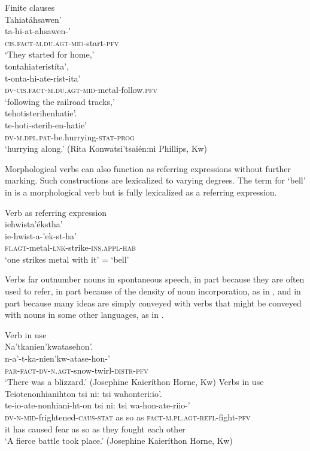 \documentclass[output=paper,colorlinks,citecolor=brown]{langscibook}
\begin{document}
{
\ea\label{ex:moh:5}Finite clauses\\
    \glll Tahiatáhsawen’ \\ 
          ta-hi-at-ahsawen-’ \\ 
          \textsc{cis.fact-m.du.agt-mid}-start-\textsc{pfv} \\
    \glt ‘They started for home,’\\ 
    \medskip
    \glll tontahiateristíta’, \\ 
          t-onta-hi-ate-rist-ita’ \\
          \textsc{dv-cis.fact-m.du.agt-mid}-metal-follow.\textsc{pfv} \\
    \glt  ‘following the railroad tracks,’\\ 
    \medskip 
    \glll tehotisterihenhatie’. \\ 
          te-hoti-sterih-en-hatie’ \\
          \textsc{dv-m.dpl.pat}-be.hurrying-\textsc{stat-prog}  \\
    \glt ‘hurrying along.’ (Rita Konwatsi’tsaién:ni Phillips, Kw)
\z }


Morphological verbs can also function as referring expressions without further marking. Such constructions are lexicalized to varying degrees. The term for ‘bell’ in  is a morphological verb but is fully lexicalized as a referring expression.

\ea\label{ex:moh:6}Verb as referring expression\\
    \glll iehwista’ékstha’\\
         ie-hwist-a-’ek-st-ha’\\
         \textsc{fi.agt}-metal-\textsc{lnk}-strike-\textsc{ins.appl-hab} \\
    \glt ‘one strikes metal with it’ = ‘bell’
\z

Verbs far outnumber nouns in spontaneous speech, in part because they are often used to refer, in part because of the density of noun incorporation, as in , and in part because many ideas are simply conveyed with verbs that might be conveyed with nouns in some other languages, as in .

\ea\label{ex:moh:7}Verb in use\\
    \glll Na’tkanien’kwatasehon’. \\ 
         n-a’-t-ka-nien’kw-atase-hon-’ \\
         \textsc{par-fact-dv-n.agt}-snow-twirl-\textsc{distr-pfv} \\
    \glt ‘There was a blizzard.’ (Josephine Kaieríthon Horne, Kw)
\z 
{
\ea\label{ex:moh:8}Verbs in use\\
    \gllll Teiotenonhianihton tsi ni: tsi wahonteri:io’. \\ 
         te-io-ate-nonhiani-ht-on tsi ni: tsi wa-hon-ate-riio-’ \\
         \textsc{dv-n-mid}-frightened-\textsc{caus-stat} as so as \textsc{fact-m.pl.agt-refl}-fight-\textsc{pfv} \\
         {it has caused fear} as so as {they fought each other} \\
    \glt ‘A fierce battle took place.’ (Josephine Kaieríthon Horne, Kw)
\z }
\end{document}
